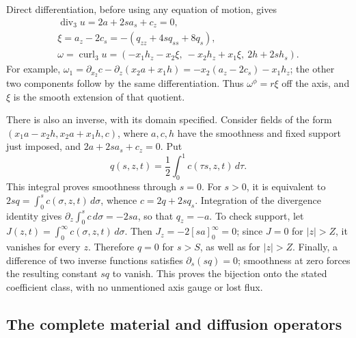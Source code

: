 Direct differentiation, before using any equation of motion, gives
\begin{equation}\label{eq:aft-divergence-vorticity}
 \begin{gathered}
 \operatorname{div}_3u=2a+2s a_s+c_z=0,\\
 \xi=a_z-2c_s=-(q_{zz}+4s q_{ss}+8q_s),\\
 \omega=\operatorname{curl}_3u
 =(-x_1h_z-x_2\xi,\ -x_2h_z+x_1\xi,\ 2h+2s h_s).
 \end{gathered}
\end{equation}
For example, \(\omega_1=\partial_{x_2}c-\partial_z(x_2a+x_1h)
=-x_2(a_z-2c_s)-x_1h_z\); the other two components follow by the
same differentiation.  Thus \(\omega^\phi=r\xi\) off the axis,
and \(\xi\) is the smooth extension of that quotient.

There is also an inverse, with its domain specified.  Consider fields of
the form \((x_1a-x_2h,x_2a+x_1h,c)\), where \(a,c,h\) have the
smoothness and fixed support just imposed, and
\(2a+2s a_s+c_z=0\).  Put
\begin{equation}\label{eq:aft-inverse}
 q(s,z,t)=\frac12\int_0^1 c(\tau s,z,t)\,d\tau.
\end{equation}
This integral proves smoothness through \(s=0\).  For \(s>0\), it is
equivalent to \(2s q=\int_0^s c(\sigma,z,t)\,d\sigma\), whence
\(c=2q+2s q_s\).  Integration of the divergence identity gives
\(\partial_z\int_0^s c\,d\sigma=-2s a\), so that \(q_z=-a\).
To check support, let \(J(z,t)=\int_0^\infty c(\sigma,z,t)\,d\sigma\).
Then \(J_z=-2[s a]_0^\infty=0\); since \(J=0\) for \(|z|>Z\),
it vanishes for every \(z\).  Therefore \(q=0\) for \(s>S\), as
well as for \(|z|>Z\).  Finally, a difference of two inverse functions
satisfies \(\partial_s(sq)=0\); smoothness at zero forces the resulting
constant \(sq\) to vanish.  This proves the bijection onto the stated
coefficient class, with no unmentioned axis gauge or lost flux.

\subsection{The complete material and diffusion operators}

